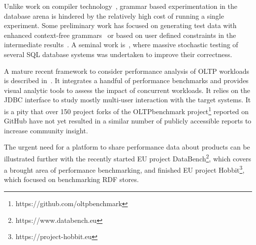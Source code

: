 \documentclass{cidr-2019}
\begin{document}
Unlike work on compiler technology~\cite{McKeeman98differentialtesting},
grammar based
experimentation in the database arena is hindered by the relatively
high cost of running a single experiment. Some preliminary work has
focused on generating test data with enhanced context-free
grammars~\cite{10.1007/978-3-319-11245-9_19} or based on user defined
constraints in the intermediate
results~\cite{Binnig:2007:QGQ:1247480.1247520}. A seminal work
is~\cite{DBLP:conf/vldb/Slutz98}, where massive stochastic testing of
several SQL database systems was undertaken to improve their
correctness.

A mature recent framework to consider performance analysis of OLTP
workloads is described in~\cite{DBLP:journals/pvldb/DifallahPCC13}. It
integrates a handful of performance benchmarks and provides visual
analytic tools to assess the impact of concurrent workloads. It
relies on the JDBC interface to study mostly multi-user interaction
with the target systems. It is a pity that over 150 project forks
of the OLTPbenchmark project\footnote{https://github.com/oltpbenchmark}
reported on GitHub
have not yet resulted in a similar number of publicly accessible
reports to increase community insight.

The urgent need for a platform to share performance data about
products can be illustrated further with the recently started EU project DataBench\footnote{https://www.databench.eu},
which covers a brought area of performance benchmarking,
and finished EU project Hobbit\footnote{https://project-hobbit.eu}, which focused on benchmarking RDF stores.  

\end{document}
